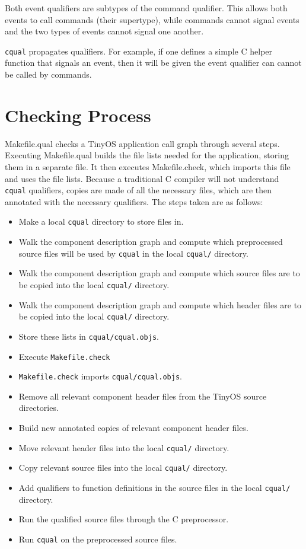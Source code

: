 \documentclass[12pt]{article}
\begin{document}
Both event qualifiers are subtypes of the command qualifier. This
allows both events to call commands (their supertype), while commands
cannot signal events and the two types of events cannot signal one
another.

{\tt cqual} propagates qualifiers. For example, if one defines a
simple C helper function that signals an event, then it will be given
the event qualifier can cannot be called by commands.

\section*{Checking Process}

Makefile.qual checks a TinyOS application call graph through several
steps. Executing Makefile.qual builds the file lists needed for the
application, storing them in a separate file. It then executes
Makefile.check, which imports this file and uses the file
lists. Because a traditional C compiler will not understand {\tt
cqual} qualifiers, copies are made of all the necessary files, which
are then annotated with the necessary qualifiers. The steps taken are
as follows:

\begin{itemize}
\item Make a local {\tt cqual} directory to store files in.
\item Walk the component description graph and compute which preprocessed source files will be used by {\tt cqual} in the local {\tt cqual/} directory.
\item Walk the component description graph and compute which source files are to be copied into the local {\tt cqual/} directory.
\item Walk the component description graph and compute which header files are to be copied into the local {\tt cqual/} directory.
\item Store these lists in {\tt cqual/cqual.objs}.
\item Execute {\tt Makefile.check}
\item {\tt Makefile.check} imports {\tt cqual/cqual.objs}.
\item Remove all relevant component header files from the TinyOS source directories.
\item Build new annotated copies of relevant component header files.
\item Move relevant header files into the local {\tt cqual/} directory.
\item Copy relevant source files into the local {\tt cqual/} directory.
\item Add qualifiers to function definitions in the source files in the local {\tt cqual/} directory.
\item Run the qualified source files through the C preprocessor.
\item Run {\tt cqual} on the preprocessed source files.
\end{itemize}
\end{document}
